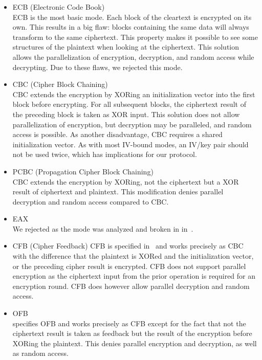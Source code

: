 \begin{itemize}
	\item ECB (Electronic Code Book)\\
	ECB is the most basic mode. Each block of the cleartext is encrypted on its own. This results in a big flaw: blocks containing the same data will always transform to the same ciphertext. This property makes it possible to see some structures of the plaintext when looking at the ciphertext. This solution allows the parallelization of encryption, decryption, and random access while decrypting. Due to these flaws, we rejected this mode.
	\item CBC (Cipher Block Chaining)\\  
	CBC extends the encryption by XORing an initialization vector into the first block before encrypting. For all subsequent blocks, the ciphertext result of the preceding block is taken as XOR input. This solution does not allow parallelization of encryption, but decryption may be paralleled, and random access is possible. As another disadvantage, CBC requires a shared initialization vector. As with most IV-bound modes, an IV/key pair should not be used twice, which has implications for our protocol.
	\item PCBC (Propagation Cipher Block Chaining)\\
	CBC extends the encryption by XORing, not the ciphertext but a XOR result of ciphertext and plaintext. This modification denies parallel decryption and random access compared to CBC.
	\item EAX\\      
	We rejected as the mode was analyzed and broken in \citeyear{minematsu2013attacks} in~\cite{minematsu2013attacks}.
	\item CFB (Cipher Feedback)
	CFB is specified in~\cite{dworkin2001recommendation} and works precisely as CBC with the difference that the plaintext is XORed and the initialization vector, or the preceding cipher result is encrypted. CFB does not support parallel encryption as the ciphertext input from the prior operation is required for an encryption round. CFB does however allow parallel decryption and random access.
	\item OFB\\
	\cite{dworkin2001recommendation} specifies OFB and works precisely as CFB except for the fact that not the ciphertext result is taken as feedback but the result of the encryption before XORing the plaintext. This denies parallel encryption and decryption, as well as random access.

\end{itemize}
